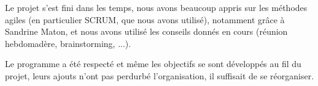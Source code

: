 Le projet s'est fini dans les temps, nous avons beaucoup appris sur les méthodes agiles (en particulier SCRUM, que nous avons utilisé), notamment grâce à Sandrine Maton, et nous avons utilisé les conseils donnés en cours (réunion hebdomadère, brainstorming, ...).

Le programme a été respecté et même les objectifs se sont développés au fil du projet, leurs ajouts n'ont pas perdurbé l'organisation, il suffisait de se réorganiser.
